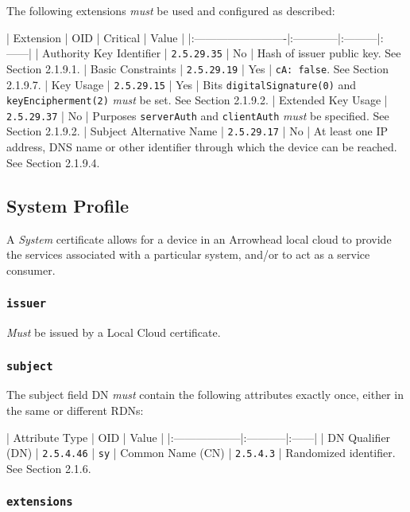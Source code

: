 The following extensions \textit{must} be used and configured as described:

| Extension                | OID         | Critical | Value |
|:-------------------------|:------------|:---------|:------|
| Authority Key Identifier | \texttt{2.5.29.35} | No       | Hash of issuer public key. See Section 2.1.9.1.
| Basic Constraints        | \texttt{2.5.29.19} | Yes      | \texttt{cA: false}. See Section 2.1.9.7.
| Key Usage                | \texttt{2.5.29.15} | Yes      | Bits \texttt{digitalSignature(0)} and \texttt{keyEncipherment(2)} \textit{must} be set. See Section 2.1.9.2.
| Extended Key Usage       | \texttt{2.5.29.37} | No       | Purposes \texttt{serverAuth} and \texttt{clientAuth} \textit{must} be specified. See Section 2.1.9.2.
| Subject Alternative Name | \texttt{2.5.29.17} | No       | At least one IP address, DNS name or other identifier through which the device can be reached. See Section 2.1.9.4.

\subsection{System Profile}

A \textit{System} certificate allows for a device in an Arrowhead local cloud to provide the services associated with a particular system, and/or to act as a service consumer.

\subsubsection{\texttt{issuer}}

\textit{Must} be issued by a Local Cloud certificate.

\subsubsection{\texttt{subject}}

The subject field DN \textit{must} contain the following attributes exactly once, either in the same or different RDNs:

| Attribute Type    | OID        | Value |
|:------------------|:-----------|:------|
| DN Qualifier (DN) | \texttt{2.5.4.46} | \texttt{sy}
| Common Name (CN)  | \texttt{2.5.4.3}  | Randomized identifier. See Section 2.1.6.

\subsubsection{\texttt{extensions}}

